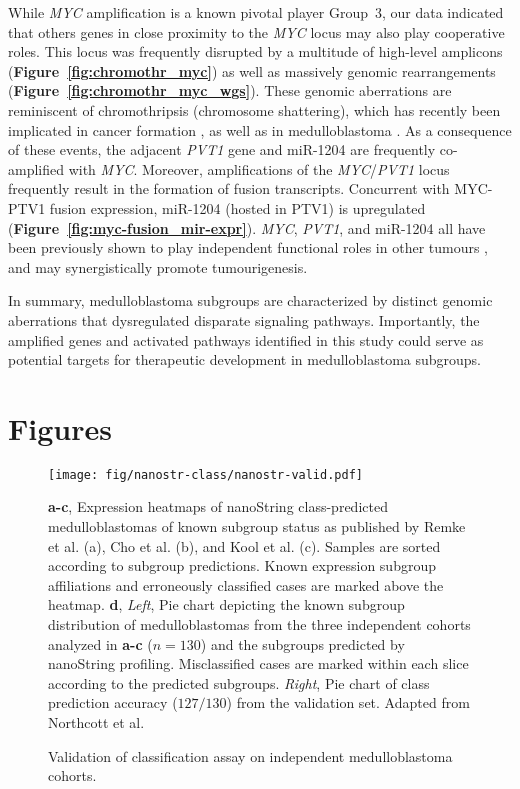 \documentclass[11pt,letterpaper]{article}
\theoremstyle{definition}
\begin{document}
While \emph{MYC} amplification is a known pivotal player Group~3, our data indicated that others genes in close proximity to the \emph{MYC} locus may also play cooperative roles. This locus was frequently disrupted by a multitude of high-level amplicons (\textbf{Figure~\ref{fig:chromothr_myc}}) as well as massively genomic rearrangements (\textbf{Figure~\ref{fig:chromothr_myc_wgs}}). These genomic aberrations are reminiscent of chromothripsis (chromosome shattering), which has recently been implicated in cancer formation , as well as in medulloblastoma . As a consequence of these events, the adjacent \emph{PVT1} gene and miR-1204 are frequently co-amplified with \emph{MYC}. Moreover, amplifications of the \emph{MYC}/\emph{PVT1} locus frequently result in the formation of fusion transcripts. Concurrent with MYC-PTV1 fusion expression, miR-1204 (hosted in PTV1) is upregulated (\textbf{Figure~\ref{fig:myc-fusion_mir-expr}}). \emph{MYC}, \emph{PVT1}, and miR-1204 all have been previously shown to play independent functional roles in other tumours , and may synergistically promote tumourigenesis.

In summary, medulloblastoma subgroups are characterized by distinct genomic aberrations that dysregulated disparate signaling pathways. Importantly, the amplified genes and activated pathways identified in this study could serve as potential targets for therapeutic development in medulloblastoma subgroups.

\clearpage

\section{Figures}

\begin{figure}[h]
	\begin{center}
		\texttt{[image: fig/nanostr-class/nanostr-valid.pdf]}
	\end{center}
	\caption{Validation of classification assay on independent medulloblastoma cohorts.}
	\textbf{a-c}, Expression heatmaps of nanoString class-predicted medulloblastomas of known subgroup status as published by Remke et al. (a), Cho et al. (b), and Kool et al. (c). Samples are sorted according to subgroup predictions. Known expression subgroup affiliations and erroneously classified cases are marked above the heatmap. \textbf{d}, \emph{Left}, Pie chart depicting the known subgroup distribution of medulloblastomas from the three independent cohorts analyzed in \textbf{a-c} ($n = 130$) and the subgroups predicted by nanoString profiling. Misclassified cases are marked within each slice according to the predicted subgroups. \emph{Right}, Pie chart of class prediction accuracy ($127/130$) from the validation set. Adapted from Northcott et al.
	\label{fig:nanostr-valid}
\end{figure}
\end{document}
